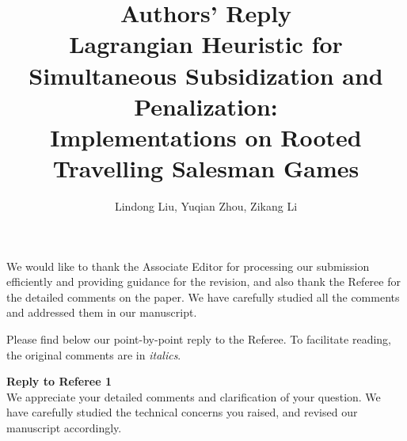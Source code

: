 \documentclass[11pt]{article}
\title{\textbf{Authors' Reply\\Lagrangian Heuristic for Simultaneous Subsidization and Penalization:\\
Implementations on Rooted Travelling Salesman Games}}
\author{Lindong Liu, Yuqian Zhou, Zikang Li}
\date{}
\begin{document}
\maketitle

\noindent

We would like to thank the Associate Editor for processing our submission efficiently and providing guidance for the revision, and also thank the Referee for the detailed comments on the paper.
We have carefully studied all the comments and addressed them in our manuscript.

%
%
%
%
%
%
%
%

Please find below our point-by-point reply to the Referee. To facilitate reading, the original comments are in {\it italics}.

\newpage

\noindent \textbf{\large Reply to Referee 1}
\\[3mm]
We appreciate your detailed comments and clarification of your question.
We have carefully studied the technical concerns you raised, and revised our manuscript accordingly.
\end{document}
